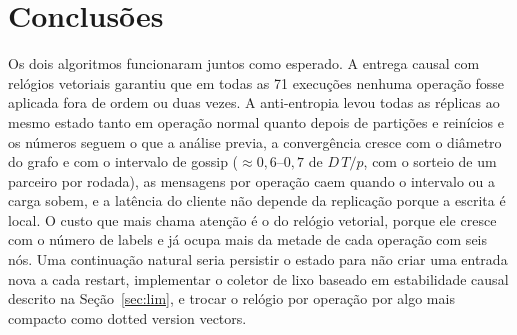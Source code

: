 \documentclass[conference,a4paper]{IEEEtran}
\begin{document}
\section{Conclusões}
Os dois algoritmos funcionaram juntos como esperado. A entrega causal com
relógios vetoriais garantiu que em todas as 71 execuções nenhuma operação
fosse aplicada fora de ordem ou duas vezes. A anti-entropia levou todas as
réplicas ao mesmo estado tanto em operação normal quanto depois de partições e
reinícios e os números seguem o que a análise previa, a convergência cresce
com o diâmetro do grafo e com o intervalo de gossip ($\approx 0{,}6$--$0{,}7$ de $D\,T/p$, com o sorteio de um parceiro por rodada), as mensagens por operação caem quando o intervalo ou a carga sobem, e a latência do cliente não depende da replicação porque a
escrita é local. O custo que mais chama atenção é o do relógio vetorial, porque ele cresce com o número de labels e já ocupa mais da metade de cada operação com seis nós. Uma continuação natural seria persistir o estado para não criar uma entrada nova a cada restart, implementar o coletor de lixo baseado em estabilidade causal descrito na Seção~\ref{sec:lim}, e trocar o relógio por operação por algo mais compacto como dotted version vectors.
\end{document}
